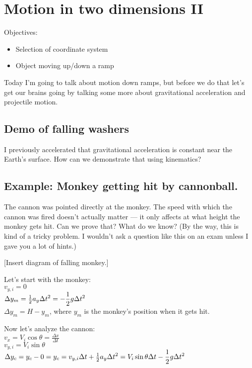 \section{Motion in two dimensions II}
Objectives:
\begin{itemize}
\item Selection of coordinate system
\item Object moving up/down a ramp
\end{itemize}

Today I'm going to talk about motion down ramps, but before we do that let's get our brains going by talking some more about gravitational acceleration and projectile motion.

\subsection{Demo of falling washers}

I previously accelerated that gravitational acceleration is constant near the Earth's surface. How can we demonstrate that using kinematics?

\subsection{Example: Monkey getting hit by cannonball.}
The cannon was pointed directly at the monkey. The speed with which the cannon was fired doesn't actually matter --- it only affects at what height the monkey gets hit. Can we prove that? What do we know? (By the way, this is kind of a tricky problem. I wouldn't ask a question like this on an exam unless I gave you a lot of hints.)

[Insert diagram of falling monkey.]
\vspace{5cm}

Let's start with the monkey:\\
$v_{y,i}=0$\\
$\Delta{y_m}=\frac{1}{2}a_y\Delta{t}\displaystyle^2=-\frac{1}{2}g\Delta{t}\displaystyle^2$\\
$\Delta{y_m}=H-y_m$, where $y_m$ is the monkey's position when it gets hit.

Now let's analyze the cannon:\\
$v_{x}=V_i\cos\theta=\frac{\Delta{x}}{\Delta{t}}$\\
$v_{y,i}=V_i\sin\theta$\\
$\Delta{y_c}=y_c-0=y_c=v_{y,i}\Delta{t}+\frac{1}{2}a_y\Delta{t}\displaystyle^2=V_i\sin\theta\Delta{t}-\frac{1}{2}g\Delta{t}\displaystyle^2$

